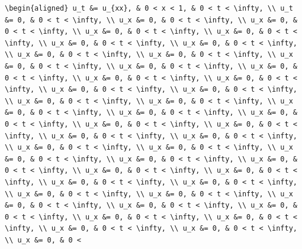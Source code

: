 \documentclass[
  ukrainian,
]{article}
\begin{document}
\begin{verbatim}
\begin{aligned} u_t &= u_{xx}, & 0 < x < 1, & 0 < t < \infty, \\ u_t &= 0, & 0 < t < \infty, \\ u_x &= 0, & 0 < t < \infty, \\ u_x &= 0, & 0 < t < \infty, \\ u_x &= 0, & 0 < t < \infty, \\ u_x &= 0, & 0 < t < \infty, \\ u_x &= 0, & 0 < t < \infty, \\ u_x &= 0, & 0 < t < \infty, \\ u_x &= 0, & 0 < t < \infty, \\ u_x &= 0, & 0 < t < \infty, \\ u_x &= 0, & 0 < t < \infty, \\ u_x &= 0, & 0 < t < \infty, \\ u_x &= 0, & 0 < t < \infty, \\ u_x &= 0, & 0 < t < \infty, \\ u_x &= 0, & 0 < t < \infty, \\ u_x &= 0, & 0 < t < \infty, \\ u_x &= 0, & 0 < t < \infty, \\ u_x &= 0, & 0 < t < \infty, \\ u_x &= 0, & 0 < t < \infty, \\ u_x &= 0, & 0 < t < \infty, \\ u_x &= 0, & 0 < t < \infty, \\ u_x &= 0, & 0 < t < \infty, \\ u_x &= 0, & 0 < t < \infty, \\ u_x &= 0, & 0 < t < \infty, \\ u_x &= 0, & 0 < t < \infty, \\ u_x &= 0, & 0 < t < \infty, \\ u_x &= 0, & 0 < t < \infty, \\ u_x &= 0, & 0 < t < \infty, \\ u_x &= 0, & 0 < t < \infty, \\ u_x &= 0, & 0 < t < \infty, \\ u_x &= 0, & 0 < t < \infty, \\ u_x &= 0, & 0 < t < \infty, \\ u_x &= 0, & 0 < t < \infty, \\ u_x &= 0, & 0 < t < \infty, \\ u_x &= 0, & 0 < t < \infty, \\ u_x &= 0, & 0 < t < \infty, \\ u_x &= 0, & 0 < t < \infty, \\ u_x &= 0, & 0 < t < \infty, \\ u_x &= 0, & 0 < t < \infty, \\ u_x &= 0, & 0 < t < \infty, \\ u_x &= 0, & 0 < t < \infty, \\ u_x &= 0, & 0 < t < \infty, \\ u_x &= 0, & 0 < t < \infty, \\ u_x &= 0, & 0 < t < \infty, \\ u_x &= 0, & 0 < 
\end{verbatim}
\end{document}

